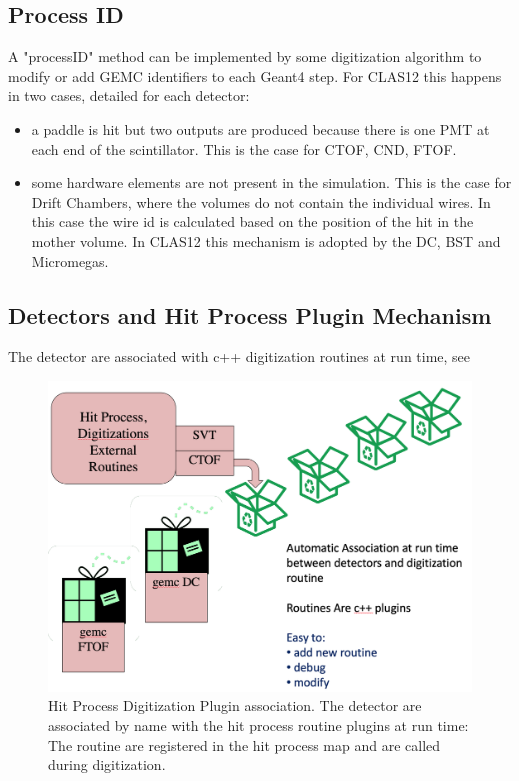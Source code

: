 \subsection{Process ID}

A "processID" method can be implemented by some digitization algorithm to modify or add GEMC identifiers to each Geant4 step. For CLAS12 this happens in two
cases, detailed for each detector:

\begin{itemize}
	\item a paddle is hit but two outputs are produced because there is one PMT at each end of the scintillator. This
          is the case for CTOF, CND, FTOF.
    \item some hardware elements are not present in the simulation. This is the case for Drift Chambers, where the volumes do not contain
          the individual wires. In this case the wire id is calculated based on the position of the hit in the mother volume. In CLAS12 this mechanism
          is adopted by the DC, BST and Micromegas.
\end{itemize}


\subsection{Detectors and Hit Process Plugin Mechanism}
The detector are associated with c++ digitization routines at run time, see 

\begin{figure}
	\centering
	\includegraphics[width=0.95\columnwidth,keepaspectratio]{img/pluginsAssociation.png}
	\caption{Hit Process Digitization Plugin association. The detector are associated by name with the hit process routine plugins at run time:
			 The routine are registered in the hit process map and are called during digitization.}
	\label{fig:pluginsAssociation}
\end{figure}

